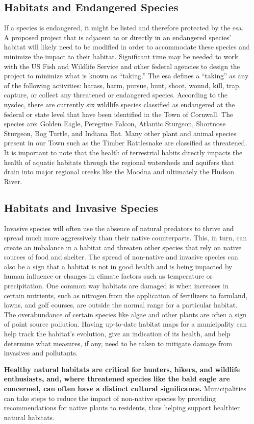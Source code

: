 \subsection*{Habitats and Endangered Species}
If a species is endangered, it might be listed and therefore protected by the
\gls{esa}. A proposed project that is adjacent to or directly in an endangered
species’ habitat will likely need to be modified in order to accommodate these
species and minimize the impact to their habitat. Significant time may be
needed to work with the US Fish and Wildlife Service and other federal agencies
to design the project to minimize what is known as “taking.” The \gls{esa}
defines a ``taking'' as any of the following activities: harass, harm, pursue,
hunt, shoot, wound, kill, trap, capture, or collect any threatened or
endangered species. According to the \gls{nysdec}, there are currently six
wildlife species classified as endangered at the federal or state level that
have been identified in the Town of Cornwall. The species are: Golden Eagle,
Peregrine Falcon, Atlantic Sturgeon, Shortnose Sturgeon, Bog Turtle, and
Indiana Bat. Many other plant and animal species present in our Town such as
the Timber Rattlesnake are classified as threatened. It is important to note
that the health of terrestrial habits directly impacts the health of aquatic
habitats through the regional watersheds and aquifers that drain into major
regional creeks like the Moodna and ultimately the Hudson River. 

\subsection*{Habitats and Invasive Species}
Invasive species will often use the absence of natural predators to thrive and
spread much more aggressively than their native counterparts. This, in turn,
can create an imbalance in a habitat and threaten other species that rely on
native sources of food and shelter. The spread of non-native and invasive
species can also be a sign that a habitat is not in good health and is being
impacted by human influence or changes in climate factors such as temperature
or precipitation. One common way habitats are damaged is when increases in
certain nutrients, such as nitrogen from the application of fertilizers to
farmland, lawns, and golf courses, are outside the normal range for a
particular habitat. The overabundance of certain species like algae and other
plants are often a sign of point source pollution. Having up-to-date habitat
maps for a municipality can help track the habitat’s evolution, give an
indication of its health, and help determine what measures, if any, need to be
taken to mitigate damage from invasives and pollutants.
\par
\textbf{Healthy natural habitats are critical for hunters, hikers, and wildlife
enthusiasts, and, where threatened species like the bald eagle are concerned,
can often have a distinct cultural significance.} Municipalities can take steps
to reduce the impact of non-native species by providing recommendations for
native plants to residents, thus helping support healthier natural habitats. 

